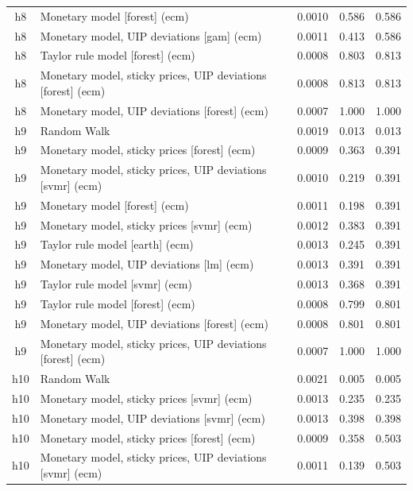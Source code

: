\begin{ThreePartTable}
\begin{longtable}[t]{cp{5.5cm}ccc}
h8 & \raggedright Monetary model [forest] (ecm) & 0.0010 & 0.586 & 0.586\\
h8 & \raggedright Monetary model, UIP deviations [gam] (ecm) & 0.0011 & 0.413 & 0.586\\
h8 & \raggedright Taylor rule model [forest] (ecm) & 0.0008 & 0.803 & 0.813\\
h8 & \raggedright Monetary model, sticky prices, UIP deviations [forest] (ecm) & 0.0008 & 0.813 & 0.813\\
h8 & \raggedright Monetary model, UIP deviations [forest] (ecm) & 0.0007 & 1.000 & 1.000\\
\addlinespace
h9 & \raggedright Random Walk & 0.0019 & 0.013 & 0.013\\
h9 & \raggedright Monetary model, sticky prices [forest] (ecm) & 0.0009 & 0.363 & 0.391\\
h9 & \raggedright Monetary model, sticky prices, UIP deviations [svmr] (ecm) & 0.0010 & 0.219 & 0.391\\
h9 & \raggedright Monetary model [forest] (ecm) & 0.0011 & 0.198 & 0.391\\
h9 & \raggedright Monetary model, sticky prices [svmr] (ecm) & 0.0012 & 0.383 & 0.391\\
h9 & \raggedright Taylor rule model [earth] (ecm) & 0.0013 & 0.245 & 0.391\\
h9 & \raggedright Monetary model, UIP deviations [lm] (ecm) & 0.0013 & 0.391 & 0.391\\
h9 & \raggedright Taylor rule model [svmr] (ecm) & 0.0013 & 0.368 & 0.391\\
h9 & \raggedright Taylor rule model [forest] (ecm) & 0.0008 & 0.799 & 0.801\\
h9 & \raggedright Monetary model, UIP deviations [forest] (ecm) & 0.0008 & 0.801 & 0.801\\
h9 & \raggedright Monetary model, sticky prices, UIP deviations [forest] (ecm) & 0.0007 & 1.000 & 1.000\\
\addlinespace
h10 & \raggedright Random Walk & 0.0021 & 0.005 & 0.005\\
h10 & \raggedright Monetary model, sticky prices [svmr] (ecm) & 0.0013 & 0.235 & 0.235\\
h10 & \raggedright Monetary model, UIP deviations [svmr] (ecm) & 0.0013 & 0.398 & 0.398\\
h10 & \raggedright Monetary model, sticky prices [forest] (ecm) & 0.0009 & 0.358 & 0.503\\
h10 & \raggedright Monetary model, sticky prices, UIP deviations [svmr] (ecm) & 0.0011 & 0.139 & 0.503\\

\end{longtable}
\end{ThreePartTable}
